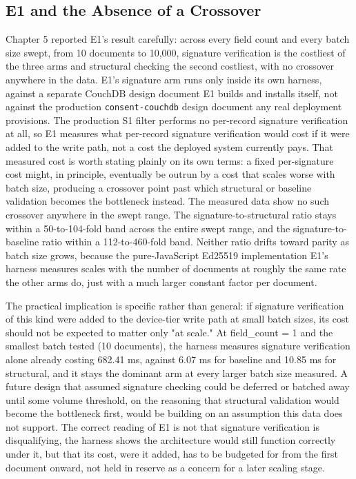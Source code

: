 \subsection{E1 and the Absence of a Crossover}

Chapter 5 reported E1's result carefully: across every field count and every batch size swept, from 10 documents to 10,000, signature verification is the costliest of the three arms and structural checking the second costliest, with no crossover anywhere in the data. E1's signature arm runs only inside its own harness, against a separate CouchDB design document E1 builds and installs itself, not against the production \texttt{consent-couchdb} design document any real deployment provisions. The production S1 filter performs no per-record signature verification at all, so E1 measures what per-record signature verification would cost if it were added to the write path, not a cost the deployed system currently pays. That measured cost is worth stating plainly on its own terms: a fixed per-signature cost might, in principle, eventually be outrun by a cost that scales worse with batch size, producing a crossover point past which structural or baseline validation becomes the bottleneck instead. The measured data show no such crossover anywhere in the swept range. The signature-to-structural ratio stays within a 50-to-104-fold band across the entire swept range, and the signature-to-baseline ratio within a 112-to-460-fold band. Neither ratio drifts toward parity as batch size grows, because the pure-JavaScript Ed25519 implementation E1's harness measures scales with the number of documents at roughly the same rate the other arms do, just with a much larger constant factor per document.

The practical implication is specific rather than general: if signature verification of this kind were added to the device-tier write path at small batch sizes, its cost should not be expected to matter only "at scale." At field\_count = 1 and the smallest batch tested (10 documents), the harness measures signature verification alone already costing 682.41 ms, against 6.07 ms for baseline and 10.85 ms for structural, and it stays the dominant arm at every larger batch size measured. A future design that assumed signature checking could be deferred or batched away until some volume threshold, on the reasoning that structural validation would become the bottleneck first, would be building on an assumption this data does not support. The correct reading of E1 is not that signature verification is disqualifying, the harness shows the architecture would still function correctly under it, but that its cost, were it added, has to be budgeted for from the first document onward, not held in reserve as a concern for a later scaling stage.

